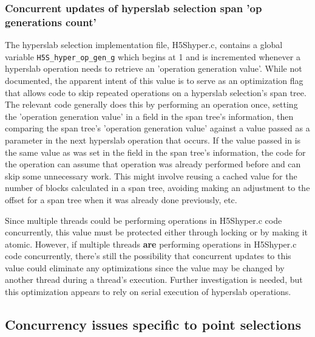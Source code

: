 \documentclass[../HDF5_RFC.tex]{subfiles}
\begin{document}
\subsubsection{Concurrent updates of hyperslab selection span 'op generations count'}
\label{h5s_op_gen}

The hyperslab selection implementation file, H5Shyper.c, contains a global variable
\texttt{H5S\_hyper\_op\_gen\_g} which begins at 1 and is incremented whenever a hyperslab
operation needs to retrieve an 'operation generation value'. While not documented, the
apparent intent of this value is to serve as an optimization flag that allows code to
skip repeated operations on a hyperslab selection's span tree. The relevant code generally
does this by performing an operation once, setting the 'operation generation value' in 
a field in the span tree's information, then comparing the span tree's 'operation generation
value' against a value passed as a parameter in the next hyperslab operation that occurs.
If the value passed in is the same value as was set in the field in the span tree's
information, the code for the operation can assume that operation was already performed
before and can skip some unnecessary work. This might involve reusing a cached value for
the number of blocks calculated in a span tree, avoiding making an adjustment to the offset
for a span tree when it was already done previously, etc.

Since multiple threads could be performing operations in H5Shyper.c code concurrently, this
value must be protected either through locking or by making it atomic. However, if multiple
threads \textbf{are} performing operations in H5Shyper.c code concurrently, there's still
the possibility that concurrent updates to this value could eliminate any optimizations
since the value may be changed by another thread during a thread's execution. Further
investigation is needed, but this optimization appears to rely on serial execution of
hyperslab operations.

\subsection{Concurrency issues specific to point selections}
\label{h5s_concurrency_point}
\end{document}
